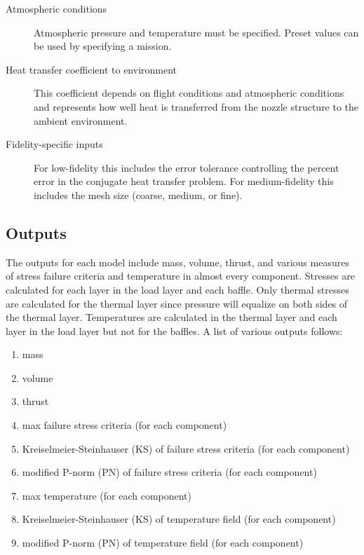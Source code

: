 \documentclass{article}
\begin{document}
\begin{description}
\item[Atmospheric conditions] Atmospheric pressure and temperature must be specified. Preset values can be used by specifying a mission.

\item[Heat transfer coefficient to environment] This coefficient depends on flight conditions and atmospheric conditions and represents how well heat is transferred from the nozzle structure to the ambient environment.

\item[Fidelity-specific inputs] For low-fidelity this includes the error tolerance controlling the percent error in the conjugate heat transfer problem. For medium-fidelity this includes the mesh size (coarse, medium, or fine).

\end{description}

\subsection{Outputs}

The outputs for each model include mass, volume, thrust, and various measures of stress failure criteria and temperature in almost every component. Stresses are calculated for each layer in the load layer and each baffle. Only thermal stresses are calculated for the thermal layer since pressure will equalize on both sides of the thermal layer. Temperatures are calculated in the thermal layer and each layer in the load layer but not for the baffles. A list of various outputs follows:

\begin{enumerate}
\item mass
\item volume
\item thrust
\item max failure stress criteria (for each component)
\item Kreiselmeier-Steinhauser (KS) of failure stress criteria (for each component)
\item modified P-norm (PN) of failure stress criteria (for each component)
\item max temperature (for each component)
\item Kreiselmeier-Steinhauser (KS) of temperature field (for each component)
\item modified P-norm (PN) of temperature field (for each component)
\end{enumerate}
\end{document}

